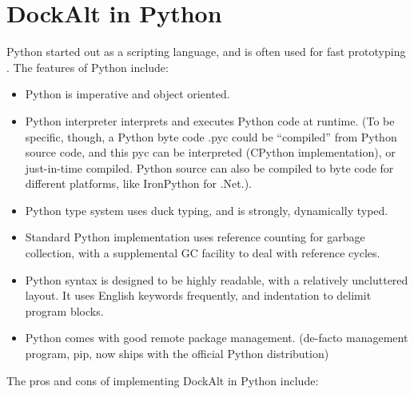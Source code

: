 \documentclass[letterpaper,twocolumn,10pt]{article}
\begin{document}
\section{DockAlt in Python}

Python started out as a scripting language, and is often used for fast prototyping \cite{PythonWikipedia}. The features of Python include:
\begin{itemize}
\item Python is imperative and object oriented.
\item Python interpreter interprets and executes Python code at runtime. (To be specific, though, a Python byte code .pyc could be ``compiled'' from Python source code, and this pyc can be interpreted (CPython implementation), or just-in-time compiled. Python source can also be compiled to byte code for different platforms, like IronPython for .Net.).
\item Python type system uses duck typing, and is strongly, dynamically typed. \cite{PythonStronglyTyped}
\item Standard Python implementation uses reference counting for garbage collection, with a supplemental GC facility to deal with reference cycles.
\item Python syntax is designed to be highly readable, with a relatively uncluttered layout. It uses English keywords frequently, and indentation to delimit program blocks. \cite{ZenPython}
\item Python comes with good remote package management. (de-facto management program, pip, now ships with the official Python distribution)
\end{itemize}
The pros and cons of implementing DockAlt in Python include: 
\end{document}
